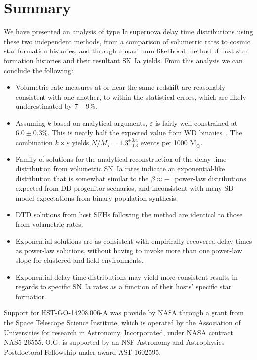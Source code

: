 \documentclass[apj, linenumbers]{aastex62}
\begin{document}
\section{Summary}
We have presented an analysis of type Ia supernova delay time distributions using these two independent methods, from a comparison of volumetric  rates to cosmic star formation histories, and through a maximum likelihood method of host star formation histories and their resultant SN~Ia yields. From this analysis we can conclude the following:
\begin{itemize}
	\item Volumetric rate measures at or near the same redshift are reasonably consistent with one another, to within the statistical errors, which are likely underestimated by $7-9\%$.
	\item  Assuming $k$ based on analytical arguments, $\varepsilon$ is fairly well constrained at $6.0\pm0.3\%$. This is nearly half the expected value from WD binaries~\citep{Maoz:2017zl}. The combination $k\times\varepsilon$ yields $N/M_\star=1.3^{+0.4}_{-0.3}$ events per 1000 M$_{\odot}$.
	\item Family of solutions for the analytical reconstruction of the delay time distribution from volumetric SN~Ia rates indicate an exponential-like distribution that is somewhat similar to the $\beta\approx-1$ power-law distributions expected from DD progenitor scenarios, and inconsistent with many SD-model expectations from binary population synthesis. 
	\item DTD solutions from host SFHs following the \cite{Maoz:2011} method are identical to those from volumetric rates. 
	\item Exponential solutions are as consistent with empirically recovered delay times as power-law solutions, without having to invoke more than one power-law slope for clustered and field environments.
	\item Exponential delay-time distributions may yield more consistent results in regards to specific SN~Ia rates as a function of their hosts' specific star formation.
\end{itemize}

\acknowledgments Support for HST-GO-14208.006-A was provide by NASA through a grant from the Space Telescope Science Institute, which is operated by the Association of Universities for research in Astronomy, Incorporated, under NASA contract NAS5-26555. O.G. is supported by an NSF Astronomy and Astrophysics Postdoctoral Fellowship under award AST-1602595.
\end{document}
